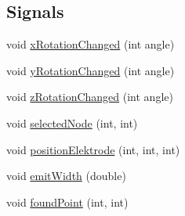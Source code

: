 \subsection*{Signals}
\begin{DoxyCompactItemize}
\item 
void \hyperlink{class_diffusion_painter_a9599253ac2faec4e4fcde0bddc4f2739}{x\+Rotation\+Changed} (int angle)
\item 
void \hyperlink{class_diffusion_painter_a327e74a49eb97c73639588de45ef7cc1}{y\+Rotation\+Changed} (int angle)
\item 
void \hyperlink{class_diffusion_painter_a30c98779110e1e02e9a6d0541a66c5a6}{z\+Rotation\+Changed} (int angle)
\item 
void \hyperlink{class_diffusion_painter_ad5ca1a51002b96b7aae86de9176acb02}{selected\+Node} (int, int)
\item 
void \hyperlink{class_diffusion_painter_a7f0ef90d74b5eb4630164bd350722ac8}{position\+Elektrode} (int, int, int)
\item 
void \hyperlink{class_diffusion_painter_a5ae021b66810c160b95dd4eb3dfd67fb}{emit\+Width} (double)
\item 
void \hyperlink{class_diffusion_painter_abde8585db92da4b64d350d61c827339f}{found\+Point} (int, int)
\end{DoxyCompactItemize}

